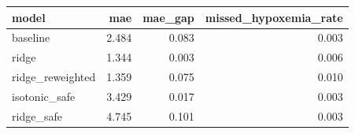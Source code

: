 \begin{tabular}{lrrr}
\toprule
model & mae & mae\_gap & missed\_hypoxemia\_rate \\
\midrule
baseline & 2.484 & 0.083 & 0.003 \\
ridge & 1.344 & 0.003 & 0.006 \\
ridge\_reweighted & 1.359 & 0.075 & 0.010 \\
isotonic\_safe & 3.429 & 0.017 & 0.003 \\
ridge\_safe & 4.745 & 0.101 & 0.003 \\
\bottomrule
\end{tabular}
